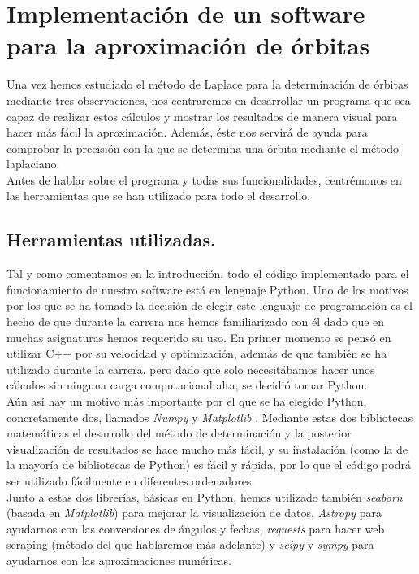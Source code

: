 \documentclass[11pt]{book}
\newcommand{\markedchapter}[2]{\chapter[#2]{#2%
\chaptermark{#1}}
\chaptermark{#1}}
\begin{document}
\markedchapter{Implementación}{Implementación de un software para la aproximación de órbitas}
Una vez hemos estudiado el método de Laplace para la determinación de órbitas mediante tres observaciones, nos centraremos en desarrollar un programa que sea capaz de realizar estos cálculos y mostrar los resultados de manera visual para hacer más fácil la aproximación. Además, éste nos servirá de ayuda para comprobar la precisión con la que se determina una órbita mediante el método laplaciano.\\

Antes de hablar sobre el programa y todas sus funcionalidades, centrémonos en las herramientas que se han utilizado para todo el desarrollo.\\

\section{Herramientas utilizadas.}
\label{sec:herramientas}
Tal y como comentamos en la introducción, todo el código implementado para el funcionamiento de nuestro software está en lenguaje Python. Uno de los motivos por los que se ha tomado la decisión de elegir este lenguaje de programación es el hecho de que durante la carrera nos hemos familiarizado con él dado que en muchas asignaturas hemos requerido su uso. En primer momento se pensó en utilizar C++ por su velocidad y optimización, además de que también se ha utilizado durante la carrera, pero dado que solo necesitábamos hacer unos cálculos sin ninguna carga computacional alta, se decidió tomar Python.\\

Aún así hay un motivo más importante por el que se ha elegido Python, concretamente dos, llamados \textit{Numpy} \cite{numpy} y \textit{Matplotlib} \cite{matplotlib}. Mediante estas dos bibliotecas matemáticas el desarrollo del método de determinación y la posterior visualización de resultados se hace mucho más fácil, y su instalación (como la de la mayoría de bibliotecas de Python) es fácil y rápida, por lo que el código podrá ser utilizado fácilmente en diferentes ordenadores.\\

Junto a estas dos librerías, básicas en Python, hemos utilizado también \textit{seaborn} \cite{seaborn} (basada en \textit{Matplotlib}) para mejorar la visualización de datos, \textit{Astropy} \cite{astropy} para ayudarnos con las conversiones de ángulos y fechas, \textit{requests} \cite{requests} para hacer web scraping (método del que hablaremos más adelante) y \textit{scipy} \cite{numpy} y \textit{sympy} \cite{sympy} para ayudarnos con las aproximaciones numéricas.\\
\end{document}
